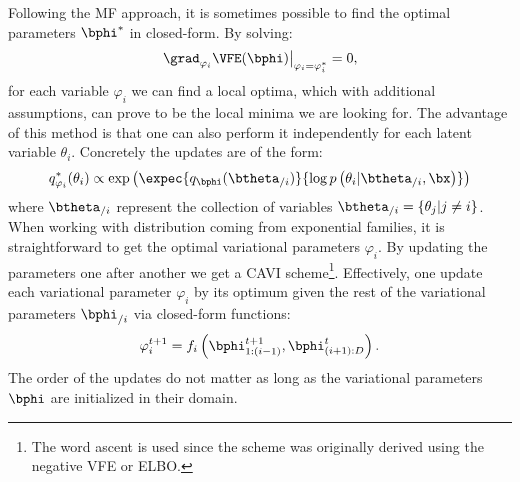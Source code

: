 Following the \ac{MF} approach, it is sometimes possible to find the optimal parameters $\bphi^*$ in closed-form.
By solving:
\begin{align}
\left.\grad_{\varphi_i}\VFE(\bphi)\right\vert_{\varphi_i=\varphi_i^*} = 0,
\end{align}
for each variable $\varphi_i$ we can find a local optima, which with additional assumptions, can prove to be the local minima we are looking for.
The advantage of this method is that one can also perform it independently for each latent variable $\theta_i$.
Concretely the updates are of the form:
\begin{align}
q_{\varphi_i}^*(\theta_i) \propto \exp\left(\expec{q_{\bphi}(\btheta_{/i})}{\log p\left(\theta_i|\btheta_{/i},\bx\right)}\right)
\end{align}
where $\btheta_{/i}$ represent the collection of variables $\btheta_{/i} = \{\theta_j | j \neq i\}$.
When working with distribution coming from exponential families, it is straightforward to get the optimal variational parameters $\varphi_i$.
By updating the parameters one after another we get a \ac{CAVI} scheme\footnote{The word ascent is used since the scheme was originally derived using the negative \ac{VFE} or \ac{ELBO}.}.
Effectively, one update each variational parameter $\varphi_i$ by its optimum given the rest of the variational parameters $\bphi_{/i}$ via closed-form functions:
\begin{align}
\varphi_i^{t+1} = f_i\left(\bphi_{1:(i-1)}^{t+1}, \bphi_{(i+1):D}^t\right).
\end{align}
The order of the updates do not matter as long as the variational parameters $\bphi$ are initialized in their domain.

